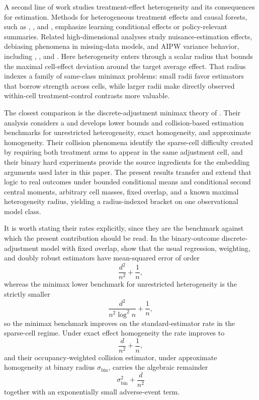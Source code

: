A second line of work studies treatment-effect heterogeneity and its consequences for estimation. Methods for heterogeneous treatment effects and causal forests, such as \citet{Wager2018}, \citet{Nie2021}, and \citet{Semenova2021}, emphasize learning conditional effects or policy-relevant summaries. Related high-dimensional analyses study nuisance-estimation effects, debiasing phenomena in missing-data models, and AIPW variance behavior, including \citet{Yadlowsky2022}, \citet{Celentano2023}, and \citet{Jiang2025}. Here heterogeneity enters through a scalar radius that bounds the maximal cell-effect deviation around the target average effect. That radius indexes a family of same-class minimax problems: small radii favor estimators that borrow strength across cells, while larger radii make directly observed within-cell treatment-control contrasts more valuable.

The closest comparison is the discrete-adjustment minimax theory of \citet{ZengBalakrishnanHanKennedy2024}. Their analysis considers a  and develops lower bounds and collision-based estimation benchmarks for unrestricted heterogeneity, exact homogeneity, and approximate homogeneity. Their collision phenomena identify the sparse-cell difficulty created by requiring both treatment arms to appear in the same adjustment cell, and their binary hard experiments provide the source ingredients for the embedding arguments used later in this paper. The present results transfer and extend that logic to real outcomes under bounded conditional means and conditional second central moments, arbitrary cell masses, fixed overlap, and a known maximal heterogeneity radius, yielding a radius-indexed bracket on one observational model class.

It is worth stating their rates explicitly, since they are the benchmark against which the present contribution should be read. In the binary-outcome discrete-adjustment model with fixed overlap, \citet{ZengBalakrishnanHanKennedy2024} show that the usual regression, weighting, and doubly robust estimators have mean-squared error of order
\[
\frac{d^2}{n^2}+\frac1n ,
\]
whereas the minimax lower benchmark for unrestricted heterogeneity is the strictly smaller
\[
\frac{d^2}{n^2\log^2 n}+\frac1n ,
\]
so the minimax benchmark improves on the standard-estimator rate in the sparse-cell regime. Under exact effect homogeneity the rate improves to
\[
\frac d{n^2}+\frac1n ,
\]
and their occupancy-weighted collision estimator, under approximate homogeneity at binary radius \(\sigma_{\mathrm{bin}}\), carries the algebraic remainder
\[
\sigma_{\mathrm{bin}}^2+\frac d{n^2}
\]
together with an exponentially small adverse-event term.

